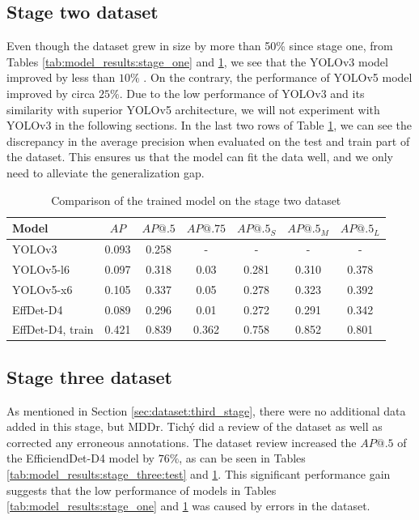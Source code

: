 \subsection{Stage two dataset}
Even though the dataset grew in size by more than 50\% since stage one, from Tables \ref{tab:model_results:stage_one} and \ref{tab:model_results:stage_two}, we see that the YOLOv3 model improved by less than $10\%$ . On the contrary, the performance of YOLOv5 model improved by circa $25\%$. Due to the low performance of YOLOv3 and its similarity with superior YOLOv5 architecture, we will not experiment with YOLOv3 in the following sections.
In the last two rows of Table \ref{tab:model_results:stage_two}, we can see the discrepancy in the average precision when evaluated on the test and train part of the dataset. This ensures us that the model can fit the data well, and we only need to alleviate the generalization gap.
\begin{table}[H]
    \centering
    \begin{tabular}{|l|c|c|c|c|c|c|}
        \hline
        Model            & $AP$  & $AP@.5$ & $AP@.75$ & $AP@.5_S$ & $AP@.5_M$ & $AP@.5_L$ \\ \hline
        YOLOv3           & 0.093 & 0.258   & -        & -         & -         & -         \\ \hline
        YOLOv5-l6        & 0.097 & 0.318   & 0.03     & 0.281     & 0.310     & 0.378     \\ \hline
        YOLOv5-x6        & 0.105 & 0.337   & 0.05     & 0.278     & 0.323     & 0.392     \\ \hline
        EffDet-D4        & 0.089 & 0.296   & 0.01     & 0.272     & 0.291     & 0.342     \\ \hline
        EffDet-D4, train & 0.421 & 0.839   & 0.362    & 0.758     & 0.852     & 0.801     \\ \hline
    \end{tabular}
    \caption{Comparison of the trained model on the stage two dataset}
    \label{tab:model_results:stage_two}
\end{table}

\subsection{Stage three dataset}
As mentioned in Section \ref{sec:dataset:third_stage}, there were no additional data added in this stage, but MDDr. Tichý did a review of the dataset as well as corrected any erroneous annotations. The dataset review increased the $AP@.5$ of the EfficiendDet-D4 model by $76\%$, as can be seen in Tables \ref{tab:model_results:stage_three:test} and \ref{tab:model_results:stage_two}. This significant performance gain suggests that the low performance of models in Tables \ref{tab:model_results:stage_one} and \ref{tab:model_results:stage_two} was caused by errors in the dataset.

